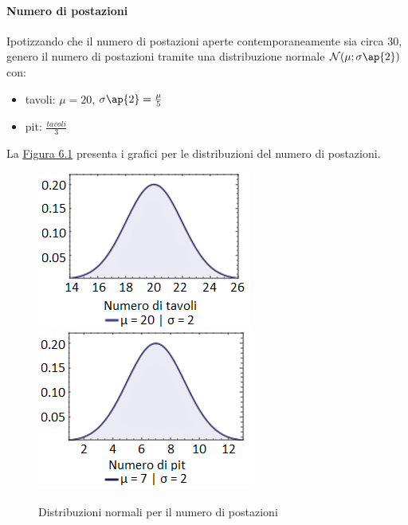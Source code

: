     \paragraph{Numero di postazioni} Ipotizzando che il numero di postazioni aperte contemporaneamente sia circa 30, genero il numero di postazioni tramite una distribuzione normale $\mathcal{N}(\mu;\sigma \ap{2})$ con:
    \begin{itemize}
        \item tavoli: $\mu = 20$, $\sigma \ap{2} = \frac{\mu}{5}$
        \item pit: $\frac{tavoli}{3}$
    \end{itemize}
\noindent
    La \hyperref[fig61]{Figura 6.1} presenta i grafici per le distribuzioni del numero di postazioni.
    \begin{figure}[!htb]
        \label{fig61}
    \begin{widepage}
    \centering
    \includegraphics[width=.49\textwidth]{../immagini/gauss_tavoli_w.png}\hfil
    \includegraphics[width=.49\textwidth]{../immagini/gauss_pit_w.png}
    \caption{Distribuzioni normali per il numero di postazioni}
    \end{widepage}
    \end{figure}
\clearpage
